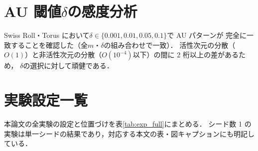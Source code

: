 \documentclass[11pt,a4paper]{jsarticle}
\begin{document}
\section{AU 閾値$\delta$の感度分析}\label{app:delta}

Swiss Roll・Torus において$\delta \in \{0.001, 0.01, 0.05, 0.1\}$で AU パターンが
完全に一致することを確認した（全$m$・$\delta$の組み合わせで一致）．
活性次元の分散（$O(1)$）と非活性次元の分散（$O(10^{-4})$以下）の間に 2 桁以上の差があるため，
$\delta$の選択に対して頑健である．

\section{実験設定一覧}\label{app:exp_table}

本論文の全実験の設定と位置づけを表\ref{tab:exp_full}にまとめる．
シード数 1 の実験は単一シードの結果であり，対応する本文の表・図キャプションにも明記している．
\end{document}
